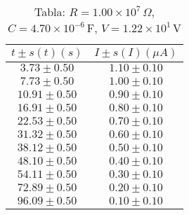 \begin{table}[H]
\centering
\setlength{\arrayrulewidth}{1.2pt}
\begin{tabular}{|c|c|}
\hline
$t \pm s(t) (s)$ & $I \pm s(I) (\mu A)$ \\
\hline
$3.73 \pm 0.50$ & $1.10 \pm 0.10$ \\
$7.73 \pm 0.50$ & $1.00 \pm 0.10$ \\
$10.91 \pm 0.50$ & $0.90 \pm 0.10$ \\
$16.91 \pm 0.50$ & $0.80 \pm 0.10$ \\
$22.53 \pm 0.50$ & $0.70 \pm 0.10$ \\
$31.32 \pm 0.50$ & $0.60 \pm 0.10$ \\
$38.12 \pm 0.50$ & $0.50 \pm 0.10$ \\
$48.10 \pm 0.50$ & $0.40 \pm 0.10$ \\
$54.11 \pm 0.50$ & $0.30 \pm 0.10$ \\
$72.89 \pm 0.50$ & $0.20 \pm 0.10$ \\
$96.09 \pm 0.50$ & $0.10 \pm 0.10$ \\
\hline
\end{tabular}
\caption*{Tabla: $R = 1.00 \times 10^{7}\,\Omega$, $C = 4.70 \times 10^{-6}$\,F, $V = 1.22 \times 10^{1}$\,V}
\end{table}
